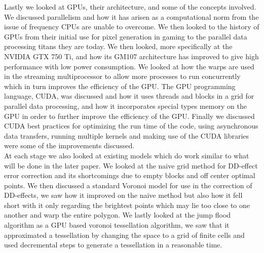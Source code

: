 Lastly we looked at GPUs, their architecture, and some of the concepts involved. We discussed parallelism and how it has arisen as a computational norm from the issue of frequency CPUs are unable to overcome. We then looked to the history of GPUs from their initial use for pixel generation in gaming to the parallel data processing titans they are today. We then looked, more specifically at the NVIDIA GTX 750 Ti, and how its GM107 architecture has improved to give high performance with low power consumption. We looked at how the warps are used in the streaming multiprocessor to allow more processes to run concurrently which in turn improves the efficiency of the GPU. The GPU programming language, CUDA, was discussed and how it uses threads and blocks in a grid for parallel data processing, and how it incorporates special types memory on the GPU in order to further improve the efficiency of the GPU. Finally we discussed CUDA best practices for optimizing the run time of the code, using asynchronous data transfers, running multiple kernels and making use of the CUDA libraries were some of the improvements discussed.
\\
At each stage we also looked at existing models which do work similar to what will be done in the later paper. We looked at the naive grid method for DD-effect error correction and its shortcomings due to empty blocks and off center optimal points. We then discussed a standard Voronoi model for use in the correction of DD-effects, we saw how it improved on the naive method but also how it fell short with it only regarding the brightest points which may lie too close to one another and warp the entire polygon. We lastly looked at the jump flood algorithm as a GPU based voronoi tessellation algorithm, we saw that it approximated a tessellation by changing the space to a grid of finite cells and used decremental steps to generate a tessellation in a reasonable time.
